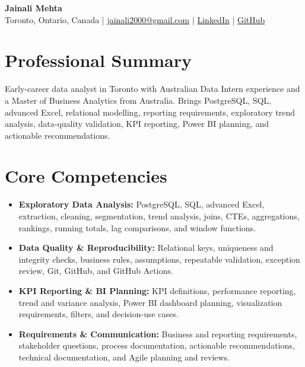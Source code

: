 \documentclass[letterpaper,10pt]{article}
\begin{document}
\begin{center}
  {\fontsize{17}{19}\selectfont\textbf{Jainali Mehta}}\\[2pt]
  \small Toronto, Ontario, Canada \;|\;
  \href{mailto:jainali2000@gmail.com}{jainali2000@gmail.com} \;|\;
  \href{https://www.linkedin.com/in/jainali-mehta}{LinkedIn} \;|\;
  \href{https://github.com/jainalimehta}{GitHub}
\end{center}
\vspace{-7pt}

\section{Professional Summary}
\small Early-career data analyst in Toronto with Australian Data Intern experience and a Master of Business Analytics from Australia. Brings PostgreSQL, SQL, advanced Excel, relational modelling, reporting requirements, exploratory trend analysis, data-quality validation, KPI reporting, Power BI planning, and actionable recommendations.

\section{Core Competencies}
\begin{itemize}[leftmargin=0.16in,label=\textbullet,topsep=0pt,itemsep=1pt,parsep=0pt]
  \item \small \textbf{Exploratory Data Analysis:} PostgreSQL, SQL, advanced Excel, extraction, cleaning, segmentation, trend analysis, joins, CTEs, aggregations, rankings, running totals, lag comparisons, and window functions.
  \item \small \textbf{Data Quality \& Reproducibility:} Relational keys, uniqueness and integrity checks, business rules, assumptions, repeatable validation, exception review, Git, GitHub, and GitHub Actions.
  \item \small \textbf{KPI Reporting \& BI Planning:} KPI definitions, performance reporting, trend and variance analysis, Power BI dashboard planning, visualization requirements, filters, and decision-use cases.
  \item \small \textbf{Requirements \& Communication:} Business and reporting requirements, stakeholder questions, process documentation, actionable recommendations, technical documentation, and Agile planning and reviews.
\end{itemize}
\end{document}
